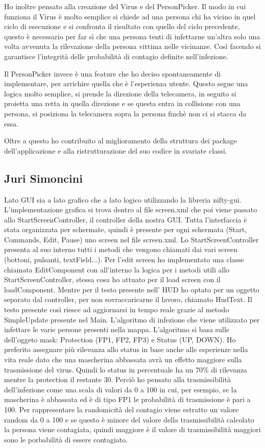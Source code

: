 Ho inoltre pensato alla creazione del Virus e del PersonPicker.
Il modo in cui funziona il Virus è molto semplice si chiede ad una persona chi ha vicino in quel ciclo di esecuzione e si confronta il risultato con quello del ciclo precedente, questo è necessario per far sì che una persona tenti di infettarne un'altra solo una volta avvenuta la rilevazione della persona vittima nelle vicinanze.
Così facendo si garantisce l'integrità delle probabilità di contagio definite nell'infezione.

Il PersonPicker invece è una feature che ho deciso spontaneamente di implementare, per arrichire quella che è l'esperienza utente.
Questo segue una logica molto semplice, si prende la direzione della telecamera, in seguito si proietta una retta in quella direzione e se questa entra in collisione con una persona, si posiziona la telecamera sopra la persona finchè non ci si stacca da essa.

Oltre a questo ho contribuito al miglioramento della struttura dei package dell'applicazione e alla ristrutturazione del suo codice in svariate classi.

\subsection{Juri Simoncini}
Lato GUI sia a lato grafico che a lato logico utilizzando la libreria nifty-gui.
L'implementazione grafica si trova dentro al file screen.xml che poi viene passato allo StartScreenController, il controller della nostra GUI.
Tutta l'interfaccia è stata organizzata per schermate, quindi è presente per ogni schermata (Start, Commands, Edit, Pause) uno screen nel file screen.xml.
Lo StartScreenController presenta al suo interno tutti i metodi che vengono chiamati dai vari screen (bottoni, pulsanti, textField...).
Per l'edit screen ho implementato una classe chiamata EditComponent con all'interno la logica per i metodi utili allo StartScreenController, stessa cosa ho attuato per il load screen con il loadComponent.
Mentre per il testo presente nell' HUD ho optato per un oggetto separato dal controller, per non sovraccaricarne il lavoro, chiamato HudText.
Il testo presente così riesce ad aggiornarsi in tempo reale grazie al metodo SimpleUpdate presente nel Main.
L'algoritmo di infezione che viene utilizzato per infettare le varie persone presenti nella mappa.
L'algoritmo si basa sulle dell'oggeto mask: Protection (FP1, FP2, FP3) e Status (UP, DOWN).
Ho preferito assegnare più rilevanza allo status in base anche alle esperienze nella vita reale dato che una mascherina abbassata avrà un effetto maggiore sulla trasmissione del virus.
Quindi lo status in percentuale ha un 70\% di rilevanza mentre la protection il restante 30.
Perciò ho pensato alla trasmissibilità dell'infezione come una scala di valori da 0 a 100 in cui, per esempio, se la mascherina è abbassata ed è di tipo FP1 le probabilità di trasmissione è pari a 100.
Per rappresentare la randomicità del contagio viene estratto un valore random da 0 a 100 e se questo è minore del valore della trasmissibilità calcolato la persona viene contagiata, quindi maggiore è il valore di trasmissibilità maggiori sono le porbabilità di essere contagiato.

